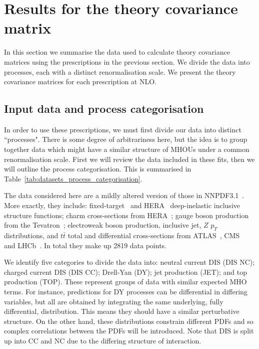\section{Results for the theory covariance matrix}
In this section we summarise the data used to calculate theory covariance matrices using the prescriptions in the previous section. We divide the data into processes, each with a distinct renormalisation scale. We present the theory covariance matrices for each prescription at NLO.

\subsection{Input data and process categorisation}
In order to use these prescriptions, we must first divide our data into distinct ``processes". There is some degree of arbitrariness here, but the idea is to group together data which might have a similar structure of MHOUs under a common renormalisation scale. First we will review the data included in these fits, then we will outline the process categorisation. This is summarised in Table~\ref{tab:datasets_process_categorisation}.

The data considered here are a mildly altered version of those in NNPDF3.1~\cite{Ball:2017nwa}. More exactly, they include: fixed-target~\cite{Arneodo:1996kd,Arneodo:1996qe,
Whitlow:1991uw,bcdms1,bcdms2,Goncharov:2001qe,MasonPhD,Onengut:2005kv} 
and HERA~\cite{Abramowicz:2015mha} deep-inelastic inclusive structure functions;
charm cross-sections from HERA~\cite{Abramowicz:1900rp};
gauge boson production from the Tevatron~\cite{Aaltonen:2010zza,Abazov:2007jy,
D0:2014kma,Abazov:2013rja}; electroweak boson production, 
inclusive jet, $Z$ $p_T$ distributions, and $t\bar{t}$ total and differential
cross-sections from ATLAS~\cite{Aad:2011dm,Aaboud:2016btc,Aad:2014qja,
Aad:2013iua,Aad:2015auj,Aad:2011fc,Aad:2014kva,Aaboud:2016pbd,Aad:2015mbv},
CMS~\cite{Chatrchyan:2013tia,Chatrchyan:2012xt,Chatrchyan:2013mza,
Khachatryan:2016pev,Khachatryan:2015oaa,Chatrchyan:2012bja,Khachatryan:2016mqs, 
Khachatryan:2015uqb,Khachatryan:2015oqa} 
and LHCb~\cite{Aaij:2012vn,Aaij:2012mda,Aaij:2015gna,Aaij:2015zlq}. In total they make up 2819 data points.
  

We identify five categories to divide the data into: neutral current DIS (DIS NC); charged current DIS (DIS CC); Drell-Yan (DY); jet production (JET); and top production (TOP). These represent groups of data with similar expected MHO terms. For instance, predictions for DY processes can be differential in differing variables, but all are obtained by integrating the same underlying, fully differential, distribution. This means they should have a similar perturbative structure. On the other hand, these distributions constrain different PDFs and so complex correlations between the PDFs will be introduced. Note that DIS is split up into CC and NC due to the differing structure of interaction.

